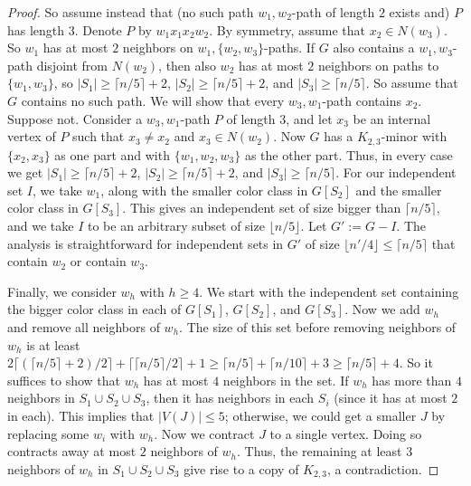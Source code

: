 \documentclass[10pt,a4paper]{amsart}
\newcommand\ceil[1]{\lceil#1\rceil}
\newcommand\floor[1]{\lfloor#1\rfloor}
\renewcommand\ge\geqslant
\renewcommand\le\leqslant
\begin{document}
\begin{proof}
So assume instead that (no such path $w_1,w_2$-path of length $2$ exists and) $P$ has length $3$.
Denote $P$ by $w_1x_1x_2w_2$.  By symmetry, assume that $x_2\in N(w_3)$.  So $w_1$ has at most $2$ neighbors on $w_1,\{w_2,w_3\}$-paths.
If $G$ also contains a $w_1,w_3$-path disjoint from $N(w_2)$, then also $w_2$ has at most $2$ neighbors on paths to $\{w_1,w_3\}$,
so $|S_1|\ge \ceil{n/5}+2$, $|S_2|\ge \ceil{n/5}+2$, and $|S_3|\ge \ceil{n/5}$.  So assume that $G$ contains no such path.
We will show that every $w_3,w_1$-path contains $x_2$.  Suppose not.  Consider a $w_3,w_1$-path $P$ of length $3$, and let $x_3$
be an internal vertex of $P$ such that $x_3\ne x_2$ and $x_3\in N(w_2)$.  Now $G$ has a $K_{2,3}$-minor with $\{x_2,x_3\}$ as one part and 
with $\{w_1,w_2,w_3\}$ as the other part.  Thus, in every case we get $|S_1|\ge \ceil{n/5}+2$, $|S_2|\ge \ceil{n/5}+2$, and $|S_3|\ge \ceil{n/5}$.
For our independent set $I$, we take $w_1$, along with the smaller color class in $G[S_2]$ and the smaller color class in $G[S_3]$.
This gives an independent set of size bigger than $\ceil{n/5}$, and we take $I$ to be an arbitrary subset of size $\floor{n/5}$.  
Let $G':=G-I$.  The analysis is straightforward for independent sets in $G'$ of size $\floor{n'/4}\le \ceil{n/5}$
that contain $w_2$ or contain $w_3$.

Finally, we consider $w_h$ with $h\ge 4$.  We start with the independent set containing the bigger color class in each of $G[S_1]$, $G[S_2]$, and $G[S_3]$.
Now we add $w_h$ and remove all neighbors of $w_h$.  The size of this set before removing neighbors of $w_h$ is at least
$2\ceil{(\ceil{n/5}+2)/2}+\ceil{\ceil{n/5}/2}+1\ge \ceil{n/5}+\ceil{n/10}+3\ge \ceil{n/5}+4$.  So it suffices to show that $w_h$ has at most $4$ neighbors
in the set.  If $w_h$ has more than $4$ neighbors in $S_1\cup S_2\cup S_3$, then it has neighbors in each $S_i$ (since it has at most $2$ in each).
This implies that $|V(J)|\le5$; otherwise, we could get a smaller $J$ by replacing some $w_i$ with $w_h$.  Now we contract $J$ to a single vertex.
Doing so contracts away at most $2$ neighbors of $w_h$.  Thus, the remaining at least $3$ neighbors of $w_h$ in $S_1\cup S_2\cup S_3$ give rise to a 
copy of $K_{2,3}$, a contradiction.
\end{proof}
\end{document}
